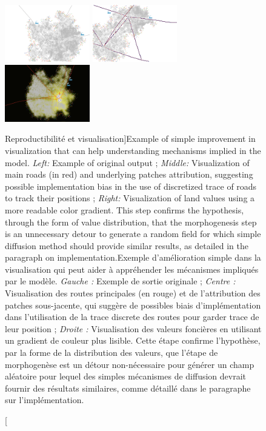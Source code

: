 \begin{figure}
\centering
\hspace{-2cm}
\includegraphics[width=0.33\textwidth]{Figures/Reproducibility/stdView}
\hfill
\includegraphics[width=0.33\textwidth]{Figures/Reproducibility/ViewRoads}
\hfill
\includegraphics[width=0.33\textwidth]{Figures/Reproducibility/landValues_cityFinished}
\caption[Reproducibility and visualization][Reproductibilité et visualisation]{Example of simple improvement in visualization that can help understanding mechanisms implied in the model. \textit{Left: } Example of original output ; \textit{Middle: } Visualization of main roads (in red) and underlying patches attribution, suggesting possible implementation bias in the use of discretized trace of roads to track their positions ; \textit{Right: }Visualization of land values using a more readable color gradient. This step confirms the hypothesis, through the form of value distribution, that the morphogenesis step is an unnecessary detour to generate a random field for which simple diffusion method should provide similar results, as detailed in the paragraph on implementation.}{Exemple d'amélioration simple dans la visualisation qui peut aider à appréhender les mécanismes impliqués par le modèle. \textit{Gauche : } Exemple de sortie originale ; \textit{Centre : } Visualisation des routes principales (en rouge) et de l'attribution des patches sous-jacente, qui suggère de possibles biais d'implémentation dans l'utilisation de la trace discrete des routes pour garder trace de leur position ; \textit{Droite : } Visualisation des valeurs foncières en utilisant un gradient de couleur plus lisible. Cette étape confirme l'hypothèse, par la forme de la distribution des valeurs, que l'étape de morphogenèse est un détour non-nécessaire pour générer un champ aléatoire pour lequel des simples mécanismes de diffusion devrait fournir des résultats similaires, comme détaillé dans le paragraphe sur l'implémentation. }
\label{fig:example_tij_viz}
\end{figure}




